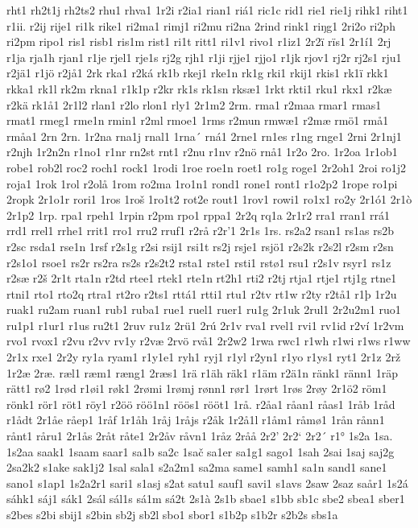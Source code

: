 rht1
rh2t1j
rh2ts2
rhu1
rhva1
1r2i
r2ia1
rian1
riá1
ric1c
rid1
rie1
rie1j
rihk1
riht1
r1ii.
r2ij
rije1
ri1k
rike1
ri2ma1
rimj1
ri2mu
ri2na
2rind
rink1
riŋg1
2ri2o
ri2ph
ri2pm
ripo1
ris1
risb1
ris1m
rist1
ri1t
ritt1
ri1v1
rivo1
r1iz1
2r2ï
rïs1
2r1í1
2rj
r1ja
rja1h
rjan1
r1je
rjel1
rje1s
rj2g
rjh1
r1ji
rjje1
rjjo1
r1jk
rjov1
rj2r
rj2s1
rju1
r2jä1
r1jö
r2jå1
2rk
rka1
r2ká
rk1b
rkej1
rke1n
rk1g
rki1
rkij1
rkis1
rk1ï
rkk1
rkka1
rk1l
rk2m
rkna1
r1k1p
r2kr
rk1s
rk1sn
rksæ1
1rkt
rkti1
rku1
rkx1
r2kæ
r2kä
rk1å1
2r1l2
rlan1
r2lo
rlon1
rly1
2r1m2
2rm.
rma1
r2maa
rmar1
rmas1
rmat1
rmeg1
rme1n
rmin1
r2ml
rmoe1
1rms
r2mun
rmwæ1
r2mæ
rmö1
rmå1
rmåa1
2rn
2rn.
1r2na
rna1j
rnal1
1rna´
rná1
2rne1
rn1es
r1ng
rnge1
2rni
2r1nj1
r2njh
1r2n2n
r1no1
r1nr
rn2st
rnt1
r2nu
r1nv
r2nö
rnå1
1r2o
2ro.
1r2oa
1r1ob1
robe1
rob2l
roc2
roch1
rock1
1rodi
1roe
roe1n
roet1
ro1g
roge1
2r2oh1
2roi
ro1j2
roja1
1rok
1rol
r2olå
1rom
ro2ma
1ro1n1
rond1
rone1
ront1
r1o2p2
1rope
ro1pi
2ropk
2r1o1r
rori1
1ros
1roš
1ro1t2
rot2e
rout1
1rov1
rowi1
ro1x1
ro2y
2r1ó1
2r1ò
2r1p2
1rp.
rpa1
rpeh1
1rpin
r2pm
rpo1
rppa1
2r2q
rq1a
2r1r2
rra1
rran1
rrá1
rrd1
rrel1
rrhe1
rrit1
rro1
rru2
rruf1
r2rå
r2r'1
2r1s
1rs.
rs2a2
rsan1
rs1as
rs2b
r2sc
rsda1
rse1n
1rsf
r2s1g
r2si
rsij1
rsi1t
rs2j
rsje1
rsjö1
r2s2k
r2s2l
r2sm
r2sn
r2s1o1
rsoe1
rs2r
rs2ra
rs2s
r2s2t2
rsta1
rste1
rsti1
rstø1
rsu1
r2s1v
rsyr1
rs1z
r2sæ
r2š
2r1t
rta1n
r2td
rtee1
rtek1
rte1n
rt2h1
rti2
r2tj
rtja1
rtje1
rtj1g
rtne1
rtni1
rto1
rto2q
rtra1
rt2ro
r2ts1
rttá1
rtti1
rtu1
r2tv
rt1w
r2ty
r2tå1
r1þ
1r2u
ruak1
ru2am
ruan1
rub1
ruba1
rue1
ruel1
ruer1
ru1g
2r1uk
2rul1
2r2u2m1
ruo1
ru1p1
r1ur1
r1us
ru2t1
2ruv
ru1z
2rü1
2rú
2r1v
rva1
rvel1
rvi1
rv1id
r2ví
1r2vm
rvo1
rvox1
r2vu
r2vv
rv1y
r2væ
2rvö
rvå1
2r2w2
1rwa
rwc1
r1wh
r1wi
r1ws
r1ww
2r1x
rxe1
2r2y
ry1a
ryam1
r1y1e1
ryh1
ryj1
r1yl
r2yn1
r1yo
r1ys1
ryt1
2r1z
2rž
1r2æ
2ræ.
ræl1
ræm1
ræng1
2ræs1
1rä
r1äh
räk1
r1äm
r2ä1n
ränk1
ränn1
1räp
rätt1
rø2
1rød
r1øi1
røk1
2rømi
1rømj
rønn1
rør1
1rørt
1røs
2røy
2r1ö2
röm1
rönk1
rör1
röt1
röy1
r2öö
röö1n1
röös1
rööt1
1rå.
r2åa1
råan1
råas1
1råb
1råd
r1ådt
2r1åe
råep1
1råf
1r1åh
1råj
1råjs
r2åk
1r2å1l
r1åm1
råmø1
1rån
rånn1
rånt1
råru1
2r1ås
2råt
råte1
2r2åv
råvn1
1råz
2råå
2r2'
2r2`
2r2´
r1°
1s2a
1sa.
1s2aa
saak1
1saam
saar1
sa1b
sa2c
1sač
sa1er
sa1g1
sago1
1sah
2sai
1saj
saj2g
2sa2k2
s1ake
sak1j2
1sal
sala1
s2a2m1
sa2ma
same1
samh1
sa1n
sand1
sane1
sano1
s1ap1
1s2a2r1
sari1
s1asj
s2at
satu1
sauf1
savi1
s1avs
2saw
2saz
saår1
1s2á
sáhk1
sáj1
sák1
2sál
sál1s
sá1m
sá2t
2s1à
2s1b
sbae1
s1bb
sb1c
sbe2
sbea1
sber1
s2bes
s2bi
sbij1
s2bin
sb2j
sb2l
sbo1
sbor1
s1b2p
s1b2r
s2b2s
sbs1a
